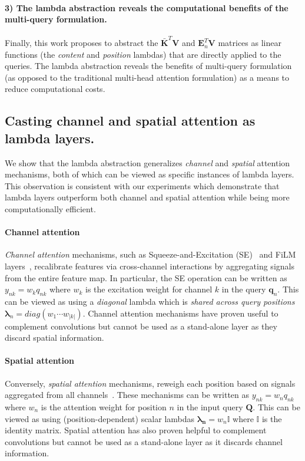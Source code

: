 \documentclass{article} \usepackage{iclr2021_conference,times}
\begin{document}
\paragraph{3) The lambda abstraction reveals the computational benefits of the multi-query formulation.}
Finally, this work proposes to abstract the $\boldsymbol{\bar{K}}^T\boldsymbol{V}$ and $\boldsymbol{E}_n^T\boldsymbol{V}$ matrices as linear functions (the \emph{content} and \emph{position} lambdas) that are directly applied to the queries.
The lambda abstraction reveals the benefits of multi-query formulation (as opposed to the traditional multi-head attention formulation) as a means to reduce computational costs.

\vspace{-0.1cm}
\subsection{Casting channel and spatial attention as lambda layers.~\label{sec:channel_spatial_attention}}
We show that the lambda abstraction generalizes \emph{channel} and \emph{spatial} attention mechanisms, both of which can be viewed as specific instances of lambda layers.
This observation is consistent with our experiments which demonstrate that lambda layers outperform both channel and spatial attention while being more computationally efficient.

\paragraph{Channel attention}
\emph{Channel attention} mechanisms, such as Squeeze-and-Excitation (SE)~\citep{hu2017squeeze,hu2018gather} and FiLM layers~\citep{perez2017film}, recalibrate features via cross-channel interactions by aggregating signals from the entire feature map.
In particular, the SE operation can be written as $y_{nk} = w_k q_{nk}$ where $w_k$ is the excitation weight for channel $k$ in the query $\boldsymbol{q}_n$.
This can be viewed as using a \emph{diagonal} lambda which is \emph{shared across query positions} $\boldsymbol{\lambda}_n = diag(w_1 \cdots w_{|k|})$.
Channel attention mechanisms have proven useful to complement convolutions but cannot be used as a stand-alone layer as they discard spatial information.

\paragraph{Spatial attention}
Conversely, \emph{spatial attention} mechanisms, reweigh each position based on signals aggregated from all channels~\citep{xu2015show,park2018bam,woo2018cbam}.
These mechanisms can be written as $y_{nk} = w_n q_{nk}$ where $w_n$ is the attention weight for position $n$ in the input query $\boldsymbol{Q}$.
This can be viewed as using (position-dependent) scalar lambdas $\boldsymbol{\lambda_n} = w_n \mathbb{I}$ where $\mathbb{I}$ is the identity matrix.
Spatial attention has also proven helpful to complement convolutions but cannot be used as a stand-alone layer as it discards channel information.
\end{document}
